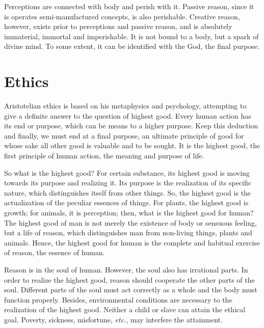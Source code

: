 \documentclass[11pt]{article}
\begin{document}
\newline

Perceptions are connected with body and perish with it. 
Passive reason, since it is operates semi-manufactured concepts, is also perishable. 
Creative reason, however, exists prior to perceptions and passive reason, and is absolutely immaterial, immortal and imperishable. 
It is not bound to a body, but a spark of divine mind. 
To some extent, it can be identified with the God, the final purpose.

\section{Ethics}
Aristotelian ethics is based on his metaphysics and psychology, attempting to give a definite answer to the question of highest good. 
Every human action has its end or purpose, which can be means to a higher purpose. 
Keep this deduction and finally, we must end at a final purpose, an ultimate principle of good for whose sake all other good is valuable and to be sought. 
It is the highest good, the first principle of human action, the meaning and purpose of life.

\newline

So what is the highest good? 
For certain substance, its highest good is moving towards its purpose and realizing it. 
Its purpose is the realization of its specific nature, which distinguishes itself from other things. 
So, the highest good is the actualization of the peculiar essences of things. 
For plants, the highest good is growth; 
for animals, it is perception; 
then, what is the highest good for human? 
The highest good of man is not merely the existence of body or sensuous feeling, but a life of reason, which distinguishes man from non-living things, plants and animals. 
Hence, the highest good for human is the complete and habitual exercise of reason, the essence of human.

\newline

Reason is in the soul of human. 
However, the soul also has irrational parts. 
In order to realize the highest good, reason should cooperate the other parts of the soul. 
Different parts of the soul must act correctly as a whole and the body must function properly. 
Besides, environmental conditions are necessary to the realization of the highest good. 
Neither a child or slave can attain the ethical goal. 
Poverty, sickness, misfortune, \textit{etc.}, may interfere the attainment.
\end{document}
